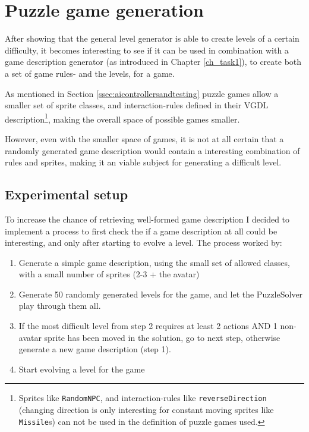 \documentclass[a4paper,titlepage,final]{report}
\begin{document}
\section{Puzzle game generation} 
\label{sec_task3evolvingGames}
After showing that the general level generator is able to create levels of a certain difficulty, it becomes interesting to see if it can be used in combination with a game description generator (as introduced in Chapter \ref{ch_task1}), to create both a set of game rules- and the levels, for a game.

As mentioned in Section \ref{ssec:aicontrollersandtesting} puzzle games allow a smaller set of sprite classes, and interaction-rules defined in their VGDL description\footnote{Sprites like \texttt{RandomNPC}, and interaction-rules like \texttt{reverseDirection} (changing direction is only interesting for constant moving sprites like \texttt{Missile}s) can not be used in the definition of puzzle games used.}, making the overall space of possible games smaller.

However, even with the smaller space of games, it is not at all certain that a randomly generated game description would contain a interesting combination of rules and sprites, making it an viable subject for generating a difficult level.

\subsection{Experimental setup} 
To increase the chance of retrieving well-formed game description I decided to implement a process to first check the if a game description at all could be interesting, and only after starting to evolve a level.
The process worked by:

\begin{enumerate}
\item Generate a simple game description, using the small set of allowed classes, with a small number of sprites (2-3 + the avatar)
\item Generate 50 randomly generated levels for the game, and let the PuzzleSolver play through them all.
\item If the most difficult level from step 2 requires at least 2 actions AND 1 non-avatar sprite has been moved in the solution, go to next step, otherwise generate a new game description (step 1).
\item Start evolving a level for the game
\end{enumerate}
\end{document}
